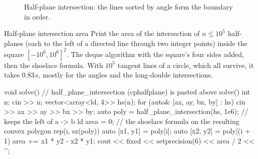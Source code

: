 \begin{figure}[htbp]
\centering
{}
\caption{Half-plane intersection: the lines sorted by angle form the boundary in order.}
\label{fig:halfplane}
\end{figure}


\begin{problem}{Half-plane intersection area}
Print the area of the intersection of $n \le 10^5$ half-planes (each to the left of a directed line through two integer points) inside the
square $[-10^6, 10^6]^2$.
\solution The deque algorithm with the square's four sides added, then the shoelace formula. With $10^5$ tangent lines of a circle,
which all survive, it takes 0.83\,s, mostly for the angles and the long-double intersections.
\end{problem}

\begin{code}
void solve() {  // half_plane_intersection (cphalfplane) is pasted above solve()
    int n;
    cin >> n;
    vector<array<ld, 4>> hs(n);
    for (auto& [ax, ay, bx, by] : hs) cin >> ax >> ay >> bx >> by;
    auto poly = half_plane_intersection(hs, 1e6);  // keeps the left of a -> b
    ld area = 0;  // the shoelace formula on the resulting convex polygon
    rep(i, sz(poly)) {
        auto [x1, y1] = poly[i];
        auto [x2, y2] = poly[(i + 1) %
        area += x1 * y2 - x2 * y1;
    }
    cout << fixed << setprecision(6) << area / 2 << '\n';
}
\end{code}

